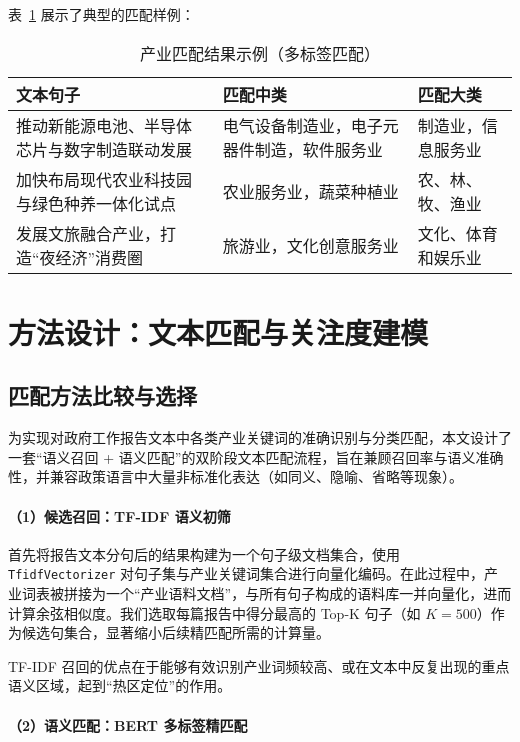 \documentclass[a4paper,11pt, fontset=fandol]{ctexart}
\begin{document}
\vspace{0.5em}
\noindent 表~\ref{tab:match_example} 展示了典型的匹配样例：

\begin{table}[H]
\centering
\caption{产业匹配结果示例（多标签匹配）}
\label{tab:match_example}
\begin{tabular}{p{6cm}p{5cm}p{3cm}}
\hline
\textbf{文本句子} & \textbf{匹配中类} & \textbf{匹配大类} \\
\hline
推动新能源电池、半导体芯片与数字制造联动发展 & 电气设备制造业，电子元器件制造，软件服务业 & 制造业，信息服务业 \\
加快布局现代农业科技园与绿色种养一体化试点 & 农业服务业，蔬菜种植业 & 农、林、牧、渔业 \\
发展文旅融合产业，打造“夜经济”消费圈 & 旅游业，文化创意服务业 & 文化、体育和娱乐业 \\
\hline
\end{tabular}
\end{table}


\newpage


\section{方法设计：文本匹配与关注度建模}


\subsection{匹配方法比较与选择}
为实现对政府工作报告文本中各类产业关键词的准确识别与分类匹配，本文设计了一套“语义召回 + 语义匹配”的双阶段文本匹配流程，旨在兼顾召回率与语义准确性，并兼容政策语言中大量非标准化表达（如同义、隐喻、省略等现象）。

\paragraph{（1）候选召回：TF-IDF 语义初筛}

首先将报告文本分句后的结果构建为一个句子级文档集合，使用 \texttt{TfidfVectorizer} 对句子集与产业关键词集合进行向量化编码。在此过程中，产业词表被拼接为一个“产业语料文档”，与所有句子构成的语料库一并向量化，进而计算余弦相似度。我们选取每篇报告中得分最高的 Top-K 句子（如 $K=500$）作为候选句集合，显著缩小后续精匹配所需的计算量。

TF-IDF 召回的优点在于能够有效识别产业词频较高、或在文本中反复出现的重点语义区域，起到“热区定位”的作用。

\paragraph{（2）语义匹配：BERT 多标签精匹配}
\end{document}
